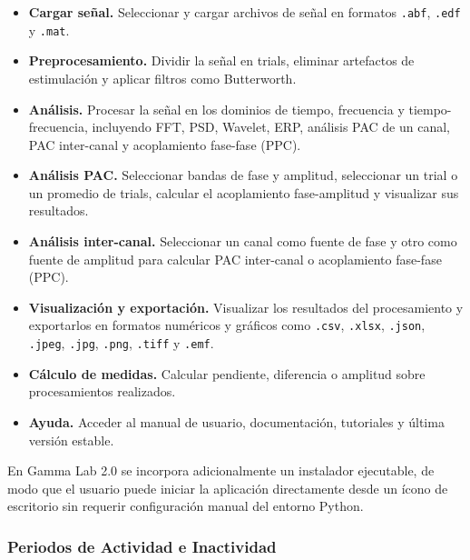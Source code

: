 \documentclass[12pt, letterpaper]{article}
\begin{document}
\begin{itemize}

    \item \textbf{Cargar señal.} Seleccionar y cargar archivos de señal en
    formatos \texttt{.abf}, \texttt{.edf} y \texttt{.mat}.

    \item \textbf{Preprocesamiento.} Dividir la señal en trials, eliminar
    artefactos de estimulación y aplicar filtros como Butterworth.

    \item \textbf{Análisis.} Procesar la señal en los dominios de tiempo,
    frecuencia y tiempo-frecuencia, incluyendo FFT, PSD, Wavelet, ERP,
    análisis PAC de un canal, PAC inter-canal y acoplamiento fase-fase (PPC).

    \item \textbf{Análisis PAC.} Seleccionar bandas de fase y amplitud,
    seleccionar un trial o un promedio de trials, calcular el
    acoplamiento fase-amplitud y visualizar sus resultados.

    \item \textbf{Análisis inter-canal.} Seleccionar un canal como fuente de
    fase y otro como fuente de amplitud para calcular PAC inter-canal o
    acoplamiento fase-fase (PPC).

    \item \textbf{Visualización y exportación.} Visualizar los resultados del
    procesamiento y exportarlos en formatos numéricos y gráficos como
    \texttt{.csv}, \texttt{.xlsx}, \texttt{.json}, \texttt{.jpeg},
    \texttt{.jpg}, \texttt{.png}, \texttt{.tiff} y \texttt{.emf}.

    \item \textbf{Cálculo de medidas.} Calcular pendiente, diferencia o amplitud sobre
    procesamientos realizados.

    \item \textbf{Ayuda.} Acceder al manual de usuario, documentación,
    tutoriales y última versión estable.

\end{itemize}

En Gamma Lab 2.0 se incorpora adicionalmente un instalador ejecutable, de modo
que el usuario puede iniciar la aplicación directamente desde un ícono de
escritorio sin requerir configuración manual del entorno Python.

\subsubsection{Periodos de Actividad e Inactividad}
\end{document}
